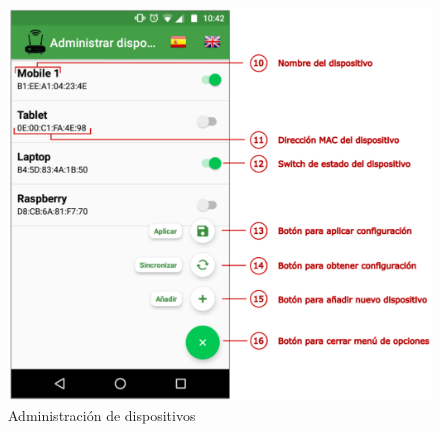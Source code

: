 \documentclass[12pt]{article}
\begin{document}
        \begin{figure}[h!]
            \centering
                \includegraphics[scale=0.5]{devices_activity_manual.eps}
                \caption{Administración de dispositivos}
                \label{fig:devices_activity_manual}
        \end{figure}
\end{document}
